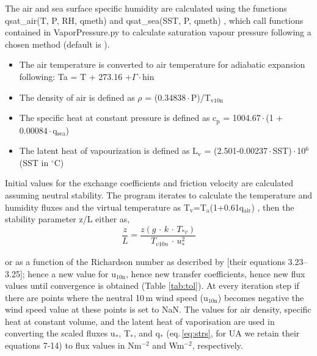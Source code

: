 \documentclass[letterpaper,10pt,english]{sphinxmanual}
\begin{document}
The air and sea surface specific humidity are calculated using the functions qsat\_air(T, P, RH, qmeth) and qsat\_sea(SST, P, qmeth) , which call functions contained in VaporPressure.py to calculate saturation vapour pressure following a chosen method (default is \cite{Buck_2012}).

\label{\detokenize{index:constants}}\begin{itemize}
\item The air temperature is converted to air temperature for adiabatic expansion following: Ta = T + 273.16 +$\Gamma$\,$\cdot$\,hin

\item The density of air is defined as $\rho$ = (0.34838\,$\cdot$\,P)/T$_\text{v10n}$

\item The specific heat at constant pressure is defined  as c$_\text{p}$ = 1004.67\,$\cdot$\,(1 + 0.00084\,$\cdot$\,q$_\text{sea}$)

\item The latent heat of vapourization is defined as L$_\text{v}$ = (2.501-0.00237\,$\cdot$\,SST)\,$\cdot$\,10$^\text{6}$ (SST in $^{\circ}$C)
\end{itemize}

Initial values for the exchange coefficients and friction velocity are calculated assuming neutral stability. The program iterates to calculate the temperature and humidity fluxes and the virtual temperature as T$_{\text{v}}$=T$_{\text{a}}$(1+0.61q$_{\text{air}}$) , then the stability parameter z/L either as,
\begin{equation}
    \frac{z}{L}=\frac{z(g\,\cdot\,k\,\cdot\,T_{*v})}{T_{v10n}\,\cdot\,u_{*}^{2}}
\end{equation}

or  as a function of the Richardson number as described by \cite{era5_2019}[their equations 3.23--3.25]; hence a new value for u$_{\text{10n}}$, hence new transfer coefficients, hence new flux values until convergence is obtained (Table \ref{tab:tol}).  At every iteration step if there are points where the neutral 10\,m wind speed (u$_{\text{10n}}$) becomes negative the wind speed value at these points is set to NaN.
The values for air density, specific heat at constant volume, and the latent heat of vaporisation are used in converting the scaled fluxes u$_{\text{$\ast$}}$, T$_{\text{$\ast$}}$, and q$_{\text{$\ast$}}$ (eq.\,\ref{eq:strs}, for UA we retain their equations 7-14) to flux values in Nm$^{-2}$ and Wm$^{-2}$, respectively.
\end{document}
